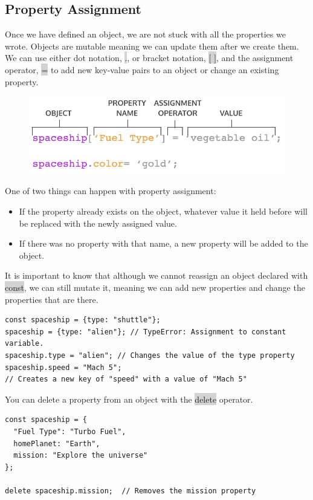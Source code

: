 \documentclass[11pt]{article}
\begin{document}
\subsection{Property Assignment}
Once we have defined an object, we are not stuck with all the properties we wrote. Objects are mutable meaning we can update them after we create them. We can use either dot notation, \colorbox{lightgray}{.}, or bracket notation, \colorbox{lightgray}{$[$ $]$}, and the assignment operator, \colorbox{lightgray}{=} to add new key-value pairs to an object or change an existing property.
\begin{figure}[H]
\includegraphics[scale = 0.68]{10_4}
\centering
\end{figure}
One of two things can happen with property assignment:
\begin{itemize}[leftmargin = *]
\item If the property already exists on the object, whatever value it held before will be replaced with the newly assigned value.
\item If there was no property with that name, a new property will be added to the object.
\end{itemize}
It is important to know that although we cannot reassign an object declared with \colorbox{lightgray}{const}, we can still mutate it, meaning we can add new properties and change the properties that are there. 
\begin{lstlisting}
const spaceship = {type: "shuttle"};
spaceship = {type: "alien"}; // TypeError: Assignment to constant variable.
spaceship.type = "alien"; // Changes the value of the type property
spaceship.speed = "Mach 5"; 
// Creates a new key of "speed" with a value of "Mach 5"
\end{lstlisting}
You can delete a property from an object with the \colorbox{lightgray}{delete} operator.
\begin{lstlisting}
const spaceship = {
  "Fuel Type": "Turbo Fuel",
  homePlanet: "Earth",
  mission: "Explore the universe"
};

delete spaceship.mission;  // Removes the mission property
\end{lstlisting}
\end{document}
